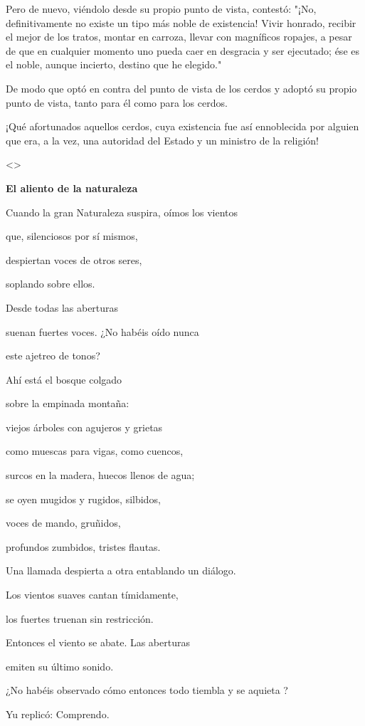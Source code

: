 Pero de nuevo, viéndolo desde su propio punto de vista, contestó: "¡No,
definitivamente no existe un tipo más noble de existencia! Vivir
honrado, recibir el mejor de los tratos, montar en carroza, llevar con
magníficos ropajes, a pesar de que en cualquier momento uno pueda caer
en desgracia y ser ejecutado; ése es el noble, aunque incierto, destino
que he elegido."

De modo que optó en contra del punto de vista de los cerdos y adoptó su
propio punto de vista, tanto para él como para los cerdos.

¡Qué afortunados aquellos cerdos, cuya existencia fue así ennoblecida
por alguien que era, a la vez, una autoridad del Estado y un ministro de
la religión!

\textless\textgreater{}

\textbf{{El aliento de la naturaleza}}

Cuando la gran Naturaleza suspira, oímos los vientos

que, silenciosos por sí mismos,

despiertan voces de otros seres,

soplando sobre ellos.

Desde todas las aberturas

suenan fuertes voces. ¿No habéis oído nunca

este ajetreo de tonos?

Ahí está el bosque colgado

sobre la empinada montaña:

viejos árboles con agujeros y grietas

como muescas para vigas, como cuencos,

surcos en la madera, huecos llenos de agua;

se oyen mugidos y rugidos, silbidos,

voces de mando, gruñidos,

profundos zumbidos, tristes flautas.

Una llamada despierta a otra entablando un diálogo.

Los vientos suaves cantan tímidamente,

los fuertes truenan sin restricción.

Entonces el viento se abate. Las aberturas

emiten su último sonido.

¿No habéis observado cómo entonces todo tiembla y se aquieta ?

Yu replicó: Comprendo.

